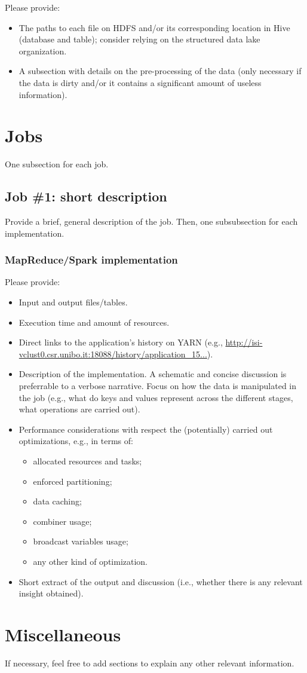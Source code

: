 \documentclass[10pt]{article}
\begin{document}
Please provide:
\begin{itemize}
\item The paths to each file on HDFS and/or its corresponding location in Hive (database and table); consider relying on the structured data lake organization.
\item A subsection with details on the pre-processing of the data (only necessary if the data is dirty and/or it contains a significant amount of useless information).
\end{itemize}


\section{Jobs}

One subsection for each job.

\subsection{Job \#1: short description}

Provide a brief, general description of the job. Then, one subsubsection for each implementation.

\subsubsection{MapReduce/Spark implementation}

Please provide:
\begin{itemize}
\item Input and output files/tables.
\item Execution time and amount of resources.
\item Direct links to the application's history on YARN (e.g., \url{http://isi-vclust0.csr.unibo.it:18088/history/application_15...}).
\item Description of the implementation. A schematic and concise discussion is preferrable to a verbose narrative. Focus on how the data is manipulated in the job (e.g., what do keys and values represent across the different stages, what operations are carried out). 
\item Performance considerations with respect the (potentially) carried out optimizations, e.g., in terms of:
\begin{itemize}
\item allocated resources and tasks;
\item enforced partitioning;
\item data caching;
\item combiner usage;
\item broadcast variables usage;
\item any other kind of optimization.
\end{itemize}
\item Short extract of the output and discussion (i.e., whether there is any relevant insight obtained).
\end{itemize}

\section{Miscellaneous}

If necessary, feel free to add sections to explain any other relevant information.
\end{document}
